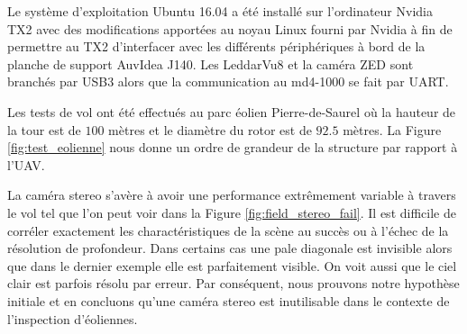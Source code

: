 Le système d'exploitation Ubuntu 16.04 a été installé sur l'ordinateur Nvidia TX2 avec des modifications apportées au noyau Linux fourni par Nvidia à fin de permettre au TX2 d'interfacer avec les différents périphériques à bord de la planche de support AuvIdea J140. Les LeddarVu8 et la caméra ZED sont branchés par USB3 alors que la communication au md4-1000 se fait par UART.

Les tests de vol ont été effectués au parc éolien Pierre-de-Saurel où la hauteur de la tour est de $100$ mètres et le diamètre du rotor est de $92.5$ mètres. La Figure \ref{fig:test_eolienne} nous donne un ordre de grandeur de la structure par rapport à l'UAV.

% 

La caméra stereo s'avère à avoir une performance extrêmement variable à travers le vol tel que l'on peut voir dans la Figure \ref{fig:field_stereo_fail}. Il est difficile de corréler exactement les charactéristiques de la scène au succès ou à l'échec de la résolution de profondeur. Dans certains cas une pale diagonale est invisible alors que dans le dernier exemple elle est parfaitement visible. On voit aussi que le ciel clair est parfois résolu par erreur. Par conséquent, nous prouvons notre hypothèse initiale et en concluons qu'une caméra stereo est inutilisable dans le contexte de l'inspection d'éoliennes.

